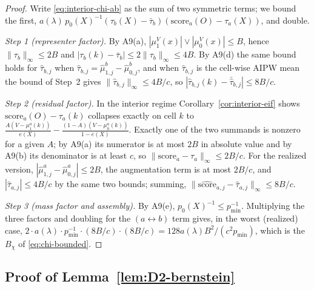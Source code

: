 \documentclass[11pt]{article}
\theoremstyle{plain}
\theoremstyle{definition}
\theoremstyle{remark}
\begin{document}
\begin{proof}
Write \eqref{eq:interior-chi-ab} as the sum of two symmetric terms; we bound the first,
$a(\lambda)\,p_0(X)^{-1}(\tau_b(X)-\bar\tau_b)(\mathrm{score}_a(O)-\tau_a(X))$, and
double.

\emph{Step 1 (representer factor).} By A9(a), $|\mu^V_1(x)|\vee|\mu^V_0(x)|\le B$, hence
$\|\tau_b\|_\infty\le2B$ and $|\tau_b(k)-\bar\tau_b|\le2\|\tau_b\|_\infty\le4B$. By A9(d)
the same bound holds for $\hat\tau_{b,j}$ when
$\hat\tau_{b,j}=\hat\mu^b_{1,j}-\hat\mu^b_{0,j}$, and when $\hat\tau_{b,j}$ is the
cell-wise AIPW mean the bound of Step~2 gives $\|\hat\tau_{b,j}\|_\infty\le4B/c$, so
$|\hat\tau_{b,j}(k)-\bar{\hat\tau}_{b,j}|\le8B/c$.

\emph{Step 2 (residual factor).} In the interior regime
Corollary~\ref{cor:interior-eif} shows $\mathrm{score}_a(O)-\tau_a(k)$ collapses exactly
on cell $k$ to
$\frac{A(V-\mu^a_1(k))}{e(X)}-\frac{(1-A)(V-\mu^a_0(k))}{1-e(X)}$. Exactly one of the two
summands is nonzero for a given $A$; by A9(a) its numerator is at most $2B$ in absolute
value and by A9(b) its denominator is at least $c$, so
$\|\mathrm{score}_a-\tau_a\|_\infty\le2B/c$. For the realized version,
$|\hat\mu^a_{1,j}-\hat\mu^a_{0,j}|\le2B$, the augmentation term is at most $2B/c$, and
$|\hat\tau_{a,j}|\le4B/c$ by the same two bounds; summing,
$\|\widehat{\mathrm{score}}_{a,j}-\hat\tau_{a,j}\|_\infty\le8B/c$.

\emph{Step 3 (mass factor and assembly).} By A9(e), $p_0(X)^{-1}\le p_{\min}^{-1}$.
Multiplying the three factors and doubling for the $(a\leftrightarrow b)$ term gives, in
the worst (realized) case,
$2\cdot a(\lambda)\cdot p_{\min}^{-1}\cdot(8B/c)\cdot(8B/c)=128a(\lambda)B^2/(c^2p_{\min})$,
which is the $B_\chi$ of \eqref{eq:chi-bounded}.
\end{proof}

\subsection{Proof of Lemma~\ref{lem:D2-bernstein}}\label{app:proof-D2-bernstein}
\end{document}
